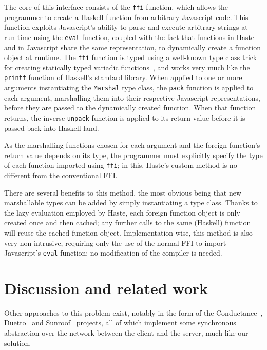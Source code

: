 \documentclass[preprint]{sigplanconf}
\begin{document}
The core of this interface consists of the \lstinline!ffi! function, which
allows the programmer to create a Haskell function from arbitrary Javascript
code. This function exploits Javascript's ability to parse and execute
arbitrary strings at run-time using the \lstinline!eval! function, coupled with
the fact that functions in Haste and in Javascript share the same
representation, to dynamically create a function object at runtime.
The \lstinline!ffi! function is typed using a well-known type class trick for
creating statically typed variadic functions\ \cite{printf}, and works very
much like the \lstinline!printf! function of Haskell's standard library.
When applied to one or more arguments instantiating the \lstinline!Marshal!
type class, the \lstinline!pack! function is applied to each argument,
marshalling them into their respective Javascript representations, before they
are passed to the dynamically created function. When that function returns,
the inverse \lstinline!unpack! function is applied to its return value before
it is passed back into Haskell land.

As the marshalling functions chosen for each argument and the foreign
function's return value depends on its type, the programmer must explicitly
specify the type of each function imported using \lstinline!ffi!; in this,
Haste's custom method is no different from the conventional FFI.

There are several benefits to this method, the most obvious being that new
marshallable types can be added by simply instantiating a type class. Thanks
to the lazy evaluation employed by Haste, each foreign function object is only
created once and then cached; any further calls to the same (Haskell) function
will reuse the cached function object. Implementation-wise, this method is also
very non-intrusive, requiring only the use of the normal FFI to import
Javascript's \lstinline!eval! function; no modification of the compiler is
needed.

\section{Discussion and related work}

Other approaches to this problem exist, notably in the form of the
Conductance\ \cite{conductance}, Duetto\ \cite{duetto} and
Sunroof\ \cite{sunroof} projects, all of which implement some synchronous
abstraction over the network between the client and the server, much like our
solution.
\end{document}
